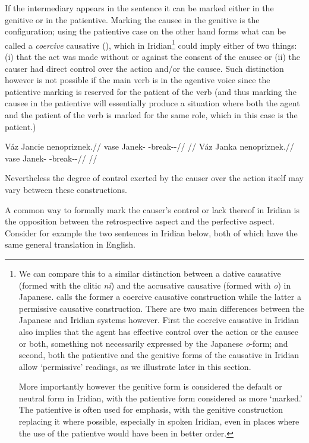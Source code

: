 If the intermediary appears in the sentence it can be marked either in the genitive or in the patientive. Marking the causee in the genitive is the  configuration; using the patientive case on the other hand forms what can be called a \emph{coercive} causative (\cite{shibatani1990,lehmann2006}), which in Iridian\footnote{We can compare this to a similar distinction between a dative causative (formed with the clitic \emph{ni}) and the accusative causative (formed with \emph{o}) in Japanese. \textcite{lehmann2006} calls the former a coercive causative construction while the latter a permissive causative construction. There are two main differences between the Japanese and Iridian systems however. First the coercive causative in Iridian also implies that the agent has effective control over the action or the causee or both, something not necessarily expressed by the Japanese \emph{o}-form; and second, both the patientive and the genitive forms of the causative in Iridian allow `permissive' readings, as we illustrate later in this section.

More importantly however the genitive form is considered the default or neutral form in Iridian, with the patientive form considered as more `marked.' The patientive is often used for emphasis, with the genitive construction replacing it where possible, especially in spoken Iridian, even in places where the use of the patientve would have been in better order.
}
could imply either of two things: (i) that the act was made without or against the consent of the causee or (ii) the causer had direct control over the action and/or the causee. Such distinction however is not possible if the main verb is in the agentive voice since the patientive marking is reserved for the patient of the verb (and thus marking the causee in the patientive will essentially produce a situation where both the agent and the patient of the verb is marked for the same role, which in this case is the patient.)

\pex
\a
\begingl
\gla Váz Jancie nenopriznek.//
\glb vase Janek-\Gen{} \Caus{}-break-\Pv{}-\Pf{}//
\glft {}//
\endgl
\a
\begingl
\gla Váz Janka nenopriznek.//
\glb vase Janek-\Acc{} \Caus{}-break-\Pv{}-\Pf{}//
\glft {}//
\endgl
\xe


Nevertheless the degree of control exerted by the causer over the action itself may vary between these constructions.

A common way to formally mark the causer's control or lack thereof in Iridian is the opposition between the retrospective aspect and the perfective aspect. Consider for example the two sentences in Iridian below, both of which have the same general translation in English.


